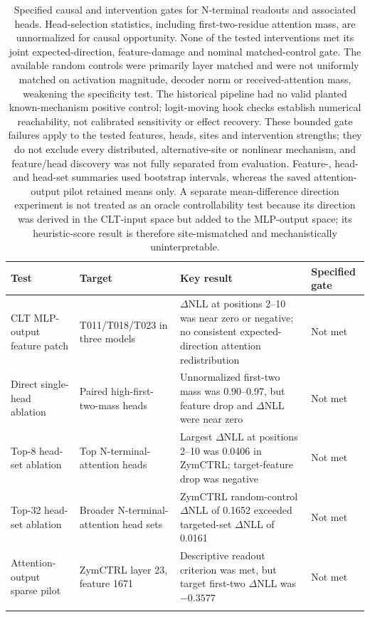 \documentclass[pdflatex,sn-nature]{sn-jnl}
\begin{document}
\begin{table}[p!]
\caption{Specified causal and intervention gates for N-terminal readouts and associated heads. Head-selection statistics, including first-two-residue attention mass, are unnormalized for causal opportunity. None of the tested interventions met its joint expected-direction, feature-damage and nominal matched-control gate. The available random controls were primarily layer matched and were not uniformly matched on activation magnitude, decoder norm or received-attention mass, weakening the specificity test. The historical pipeline had no valid planted known-mechanism positive control; logit-moving hook checks establish numerical reachability, not calibrated sensitivity or effect recovery. These bounded gate failures apply to the tested features, heads, sites and intervention strengths; they do not exclude every distributed, alternative-site or nonlinear mechanism, and feature/head discovery was not fully separated from evaluation. Feature-, head- and head-set summaries used bootstrap intervals, whereas the saved attention-output pilot retained means only. A separate mean-difference direction experiment is not treated as an oracle controllability test because its direction was derived in the CLT-input space but added to the MLP-output space; its heuristic-score result is therefore site-mismatched and mechanistically uninterpretable.}
\label{tab:supp-causal}
\scriptsize
\setlength{\tabcolsep}{3pt}
\begin{tabular}{@{}>{\raggedright\arraybackslash}p{2.7cm}>{\raggedright\arraybackslash}p{3.0cm}>{\raggedright\arraybackslash}p{4.5cm}>{\raggedright\arraybackslash}p{1.7cm}@{}}
\toprule
Test & Target & Key result & Specified gate \\
\midrule
CLT MLP-output feature patch & T011/T018/T023 in three models & $\Delta$NLL at positions 2--10 was near zero or negative; no consistent expected-direction attention redistribution & Not met \\
Direct single-head ablation & Paired high-first-two-mass heads & Unnormalized first-two mass was 0.90--0.97, but feature drop and $\Delta$NLL were near zero & Not met \\
Top-8 head-set ablation & Top N-terminal-attention heads & Largest $\Delta$NLL at positions 2--10 was 0.0406 in ZymCTRL; target-feature drop was negative & Not met \\
Top-32 head-set ablation & Broader N-terminal-attention head sets & ZymCTRL random-control $\Delta$NLL of 0.1652 exceeded targeted-set $\Delta$NLL of 0.0161 & Not met \\
Attention-output sparse pilot & ZymCTRL layer 23, feature 1671 & Descriptive readout criterion was met, but target first-two $\Delta$NLL was $-0.3577$ & Not met \\
\botrule
\end{tabular}
\end{table}
\end{document}
